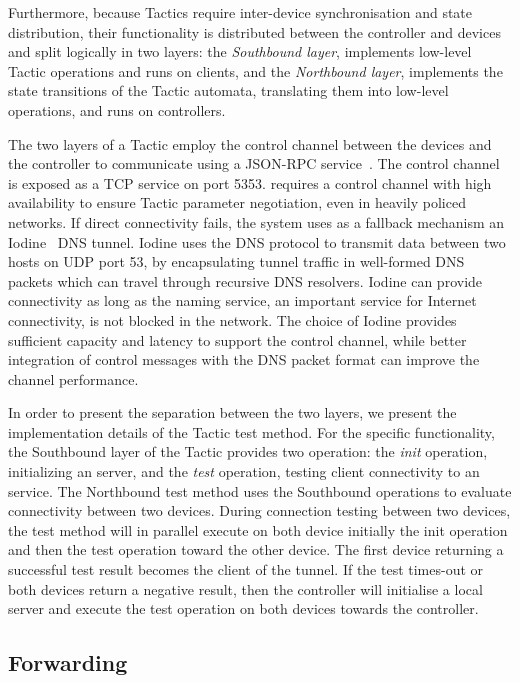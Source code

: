 Furthermore, because \signpost Tactics require inter-device synchronisation and
state distribution, their functionality is distributed between the \signpost
controller and \signpost devices and split logically in two layers: the
\emph{Southbound layer}, implements low-level Tactic operations and runs on
\signpost clients, and the \emph{Northbound layer}, implements the state
transitions of the Tactic automata, translating them into low-level operations,
and runs on \signpost controllers. 

The two layers of a Tactic employ the control channel between the devices and
the \signpost controller to communicate using a JSON-RPC
service~.  The control channel is exposed as a TCP service on
port 5353.  \signpost requires a control channel with high availability to
ensure Tactic parameter negotiation, even in heavily policed networks.  If
direct connectivity fails, the system uses as a fallback mechanism an
Iodine~ DNS tunnel. Iodine uses the DNS protocol to transmit data
between two hosts on UDP port 53, by encapsulating tunnel traffic in well-formed
DNS packets which can travel through recursive DNS resolvers. Iodine can provide
connectivity as long as the naming service, an important service for Internet
connectivity, is not blocked in the network. The choice of Iodine provides
sufficient capacity and latency to support the \signpost control channel, while
better integration of control messages with the DNS packet format can improve
the channel performance. 

In order to present the separation between the two layers, we present the
implementation details of the  \openvpn Tactic test method. For the specific
functionality, the Southbound layer of the Tactic provides two operation: the
\textit{init} operation, initializing an \openvpn server, and the \textit{test}
operation, testing client connectivity to an \openvpn service. The Northbound
test method uses the Southbound operations to evaluate connectivity between two
devices. During connection testing between two devices, the test method will in
parallel execute on both device initially the init operation and then the test
operation toward the other device.  The first device returning a successful test
result becomes the client of the \openvpn tunnel.  If the test times-out or both
devices return a negative result,  then the controller will initialise a local
\openvpn server and execute the test operation on both devices towards the
controller.

\subsection{Forwarding} \label{sec:sp-forwarding}

